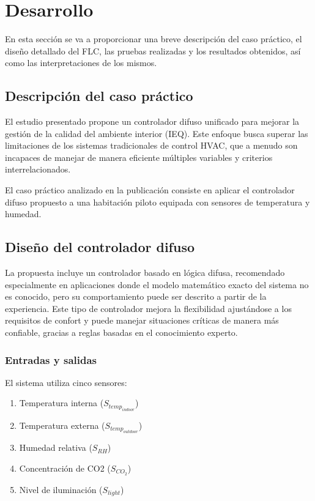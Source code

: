 \section{Desarrollo}

En esta sección se va a proporcionar una breve descripción del caso práctico, el diseño detallado del FLC, las pruebas realizadas y los resultados obtenidos, así como las interpretaciones de los mismos. 

\subsection{Descripción del caso práctico}

El estudio presentado propone un controlador difuso unificado para mejorar la gestión de la calidad del ambiente interior (IEQ). Este enfoque busca superar las limitaciones de los sistemas tradicionales de control HVAC, que a menudo son incapaces de manejar de manera eficiente múltiples variables y criterios interrelacionados. 

El caso práctico analizado en la publicación consiste en aplicar el controlador difuso propuesto a una habitación piloto equipada con sensores de temperatura y humedad. 

\subsection{Diseño del controlador difuso}

La propuesta incluye un controlador basado en lógica difusa, recomendado especialmente en aplicaciones donde el modelo matemático exacto del sistema no es conocido, pero su comportamiento puede ser descrito a partir de la experiencia. Este tipo de controlador mejora la flexibilidad ajustándose a los requisitos de confort y puede manejar situaciones críticas de manera más confiable, gracias a reglas basadas en el conocimiento experto.

\subsubsection{Entradas y salidas}

El sistema utiliza cinco sensores:

\begin{enumerate}
	\item Temperatura interna ($S_{temp_{indoor}}$)
	\item Temperatura externa ($S_{temp_{outdoor}}$)
	\item Humedad relativa ($S_{RH}$)
	\item Concentración de CO2 ($S_{CO_2}$)
	\item Nivel de iluminación ($S_{light}$)
\end{enumerate}

